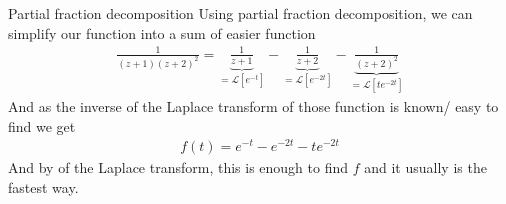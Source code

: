 \begin{parag}{Partial fraction decomposition}
	Using partial fraction decomposition, we can simplify our function into a sum of easier function 
	\begin{align*} 
		\frac{1}{\left(z + 1\right)\left(z + 2\right)^2} = \underbrace{\frac{1}{z+1}}_{= \mathcal{L}\left[e^{-t}\right]} - \underbrace{\frac{1}{z + 2}}_{= \mathcal{L}\left[e^{-2t}\right]} -\underbrace{\frac{1}{\left(z + 2\right)^2}}_{= \mathcal{L}\left[t e^{-2t}\right]} 
	\end{align*}
	And as the inverse of the Laplace transform of those function is known/ easy to find we get 
    \begin{align*} 
		f\left(t\right) = e^{-t} - e^{-2t} -te^{-2t}
	\end{align*}
	And by  of the Laplace transform, this is enough to find $f$ and it usually is the fastest way.
\end{parag}


